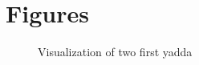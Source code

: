 \documentclass[11pt,fleqn]{article}
\begin{document}
\section{Figures}
\begin{figure}[H]
	
	\centering
	\caption{Visualization of two first yadda}
	\label{fig:2dtrajects}
\end{figure}
\end{document}
